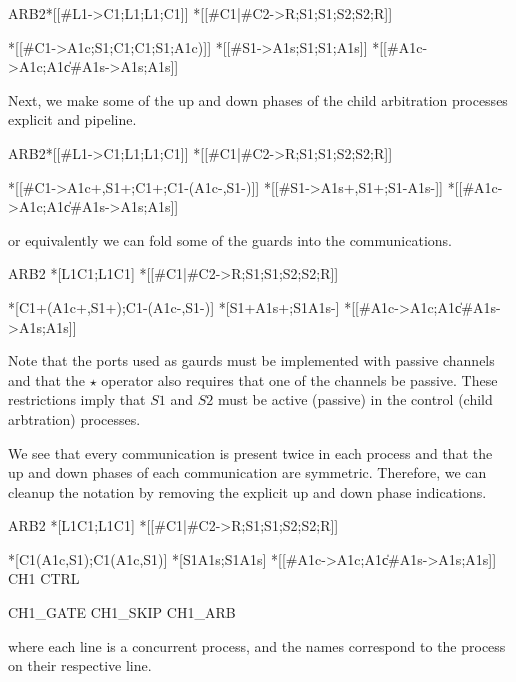 \documentclass[aer.tex]{subfiles}
\begin{document}
\begin{csp}
ARB2\equiv*
  *[[#{L1}->C1;L1;L1;C1]] \pll
  *[[#{C1}|#{C2}->R;S1;S1;S2;S2;R]] \pll

  *[[#{C1}->A1c;S1;C1;C1;S1;A1c)]] \pll
  *[[#{S1}->A1s;S1;S1;A1s]] \pll
  *[[#{A1c}->A1c;A1c\|#{A1s}->A1s;A1s]] \pll
\end{csp}

\noindent Next, we make some of the up and down phases of the child arbitration processes explicit and pipeline.

\begin{csp}
ARB2\equiv*
  *[[#{L1}->C1;L1;L1;C1]] \pll
  *[[#{C1}|#{C2}->R;S1;S1;S2;S2;R]] \pll

  *[[#{C1}->A1c+,S1+;C1+;C1-\star(A1c-,S1-)]] \pll
  *[[#{S1}->A1s+,S1+;S1-\star\!A1s-]] \pll
  *[[#{A1c}->A1c;A1c\|#{A1s}->A1s;A1s]] \pll
\end{csp}

\noindent or equivalently we can fold some of the guards into the communications.

\begin{csp}
ARB2\equiv
  *[L1\star\!C1;L1\star\!C1] \pll
  *[[#{C1}|#{C2}->R;S1;S1;S2;S2;R]] \pll

  *[C1+\star(A1c+,S1+);C1-\star(A1c-,S1-)] \pll
  *[S1+\star\!A1s+;S1\star\!A1s-] \pll
  *[[#{A1c}->A1c;A1c\|#{A1s}->A1s;A1s]] \pll
\end{csp}

Note that the ports used as gaurds must be implemented with passive channels and that
the $\star$ operator also requires that one of the channels be passive. 
These restrictions imply that $S1$ and $S2$ must be active (passive) in the control (child arbtration) processes.

We see that every communication is present twice in each process
and that the up and down phases of each communication are symmetric. 
Therefore, we can cleanup the notation by removing the explicit up and down phase indications.

\begin{csp}
ARB2\equiv
  *[L1\star\!C1;L1\star\!C1]
  *[[#{C1}|#{C2}->R;S1;S1;S2;S2;R]]

  *[C1\star(A1c,S1);C1\star(A1c,S1)]
  *[S1\star\!A1s;S1\star\!A1s]
  *[[#{A1c}->A1c;A1c\|#{A1s}->A1s;A1s]]
\equiv
  CH1
  CTRL 
 
  CH1_GATE
  CH1_SKIP
  CH1_ARB
\end{csp}

\noindent where each line is a concurrent process,
and the names correspond to the process on their respective line. 
\end{document}
